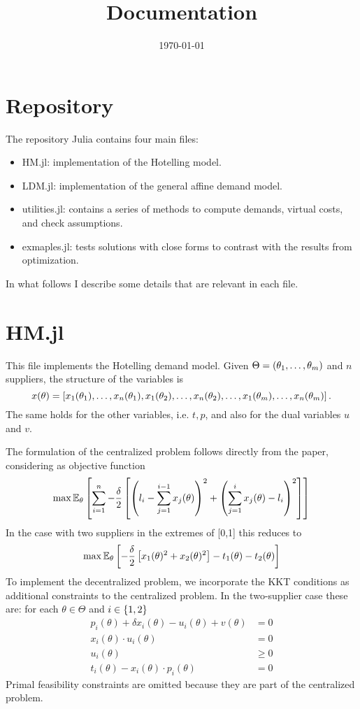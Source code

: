 \documentclass[11pt, oneside]{article}
\title{Documentation}
\date{\today}
\begin{document}
\section{Repository}

The repository Julia contains four main files:
\begin{itemize}
    \item HM.jl: implementation of the Hotelling model.
    \item LDM.jl: implementation of the general affine demand model.
    \item utilities.jl: contains a series of methods to compute demands, virtual costs, and check assumptions.
    \item exmaples.jl: tests solutions with close forms to contrast with the results from optimization.
\end{itemize}

In what follows I describe some details that are relevant in each file.

\section{HM.jl}
This file implements the Hotelling demand model. Given \(\Theta = \left(\theta_1, \ldots, \theta_m\right)\) and \(n\) suppliers, the structure of the variables
is
\[
x(\theta) = \left[x_1(\theta_1), \ldots, x_n(\theta_1), x_1(\theta_2), \ldots, x_n(\theta_2), \ldots, x_1(\theta_m), \ldots, x_n(\theta_m)\right].
\]
The same holds for the other variables, i.e. \(t, p\), and also for the dual variables \(u\) and \(v\).

The formulation of the centralized problem follows directly from the paper, considering as objective function
\[
\max \mathbb{E}_{\theta}\left[\sum_{i=1}^n
-\frac{\delta}{2}\left[ \left(l_i-\sum_{j=1}^{i-1} x_j(\theta)\right)^2 + \left(\sum_{j=1}^{i} x_j(\theta) - l_i\right)^2  \right] \right]
\]
In the case with two suppliers in the extremes of [0,1] this reduces to
\[
\max \mathbb{E}_{\theta}\left[
-\frac{\delta}{2}\left[ x_1(\theta)^2 + x_2(\theta)^2\right] - t_1(\theta) - t_2(\theta) \right]
\]
To implement the decentralized problem, we incorporate the KKT conditions as
additional constraints to the centralized problem. In the two-supplier case these are: for each \(\theta \in \Theta\) and \(i\in \left\{1,2\right\}\)
\[
\begin{split}
    p_i(\theta) + \delta x_i(\theta) - u_i(\theta) + v(\theta) &= 0 \\
    x_i(\theta)\cdot u_i(\theta) &= 0 \\
    u_i(\theta) & \geq 0 \\
    t_i(\theta) - x_i(\theta)\cdot p_i(\theta) &= 0
\end{split}
\]
Primal feasibility constraints are omitted because they are part of the centralized problem.
\end{document}
